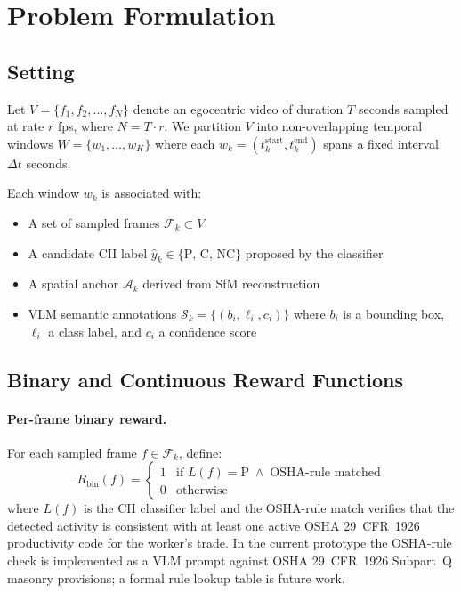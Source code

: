 \documentclass[sigconf,nonacm]{acmart}
\begin{document}
\section{Problem Formulation}

\subsection{Setting}

Let $V = \{f_1, f_2, \ldots, f_N\}$ denote an egocentric video of duration $T$
seconds sampled at rate $r$ fps, where $N = T \cdot r$. We partition $V$ into
non-overlapping temporal windows $W = \{w_1, \ldots, w_K\}$ where each
$w_k = (t_k^{\text{start}}, t_k^{\text{end}})$ spans a fixed interval
$\Delta t$ seconds.

Each window $w_k$ is associated with:
\begin{itemize}[leftmargin=1.4em,itemsep=0.1em]
\item A set of sampled frames $\mathcal{F}_k \subset V$
\item A candidate CII label $\hat{y}_k \in \{\text{P, C, NC}\}$ proposed by
  the classifier
\item A spatial anchor $\mathcal{A}_k$ derived from SfM reconstruction
\item VLM semantic annotations
  $\mathcal{S}_k = \{(b_i, \ell_i, c_i)\}$ where $b_i$ is a bounding box,
  $\ell_i$ a class label, and $c_i$ a confidence score
\end{itemize}

\subsection{Binary and Continuous Reward Functions}
\label{sec:reward-math}

\paragraph{Per-frame binary reward.}
For each sampled frame $f \in \mathcal{F}_k$, define:
\begin{equation}
  R_{\text{bin}}(f) =
  \begin{cases}
    1 & \text{if } L(f) = \mathrm{P} \;\wedge\; \text{OSHA-rule matched}\\
    0 & \text{otherwise}
  \end{cases}
\end{equation}
where $L(f)$ is the CII classifier label and the OSHA-rule match verifies
that the detected activity is consistent with at least one active OSHA
29~CFR~1926 productivity code for the worker's trade. In the current prototype
the OSHA-rule check is implemented as a VLM prompt against OSHA 29~CFR~1926
Subpart~Q masonry provisions; a formal rule lookup table is future work.
\end{document}
